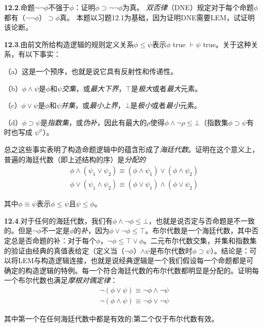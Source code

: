 \textbf{12.2}.命题${\lnot\lnot\phi}$不强于${\phi}$：证明${\phi\supset\lnot\lnot\phi}$为真。 \textit{双否律}（DNE）规定对于每个命题${\phi}$都有（${\lnot\lnot\phi}$）${\supset\phi}$真。 本题以习题12.1为基础，因为证明DNE需要LEM，试证明该论断。


\textbf{12.3}.由前文所给构造逻辑的规则定义关系${\phi\leq\psi}$表示${\phi }$ true ${\vdash}$${ \psi }$ true。关于这种关系，有以下事实：

（a）这是一个预序，也就是说它具有反射性和传递性。


（b）${\phi\land\psi}$是${\phi}$和${\psi}$\textit{交集}，或\textit{最大下界}，${\top}$是\textit{极大}或者\textit{最大}元素。%


（c）${\phi\lor\psi}$是${\phi}$和${\psi}$\textit{并集}，或\textit{最小上界}，${\bot}$是\textit{极小}或者\textit{最小}元素。


（d）${\phi\supset\psi}$是\textit{指数集}，或\textit{伪补}，因此有最大的${\rho}$使得${\phi \land \lnot\rho\leq\bot}$（指数集${\phi\supset\psi}$有时也写成 ${\psi^\phi}$）。


总之这些事实表明了构造命题逻辑中的蕴含形成了\textit{海廷代数}。证明在这个意义上，普遍的海廷代数（即上述结构的序）是\textit{分配的}
\begin{equation*}
\begin{split}
        &\phi\land(\psi_1\lor\psi_2)   \equiv (\phi\land\psi_1)\lor(\phi\land\psi_2)  \\
        &\phi\lor(\psi_1\land\psi_2)   \equiv (\phi\lor\psi_1)\land(\phi\lor\psi_2)  
\end{split}
\end{equation*}

其中${\phi\equiv\psi}$表示${\phi\leq\psi}$且${\psi\leq\phi}$。


\textbf{12.4}.对于任何的海廷代数，我们有${\phi \land \lnot\phi\leq\bot}$，也就是说否定与否命题是不一致的。但是${\lnot\phi}$不一定是${\phi}$的\textit{补}，因为${\phi \lor \lnot\phi\leq\top}$。布尔代数是一个海廷代数，其中否定总是否命题的补：对于每个${\phi}$，${\lnot\phi\leq\top \lor \phi}$。二元布尔代数交集，并集和指数集的验证由经典的真值表给定（定义当（${\lnot\phi}$）${\land\psi}$是布尔代数时${\phi\supset\psi}$）。结论是：可以将LEM与构造逻辑连接，也就是说经典逻辑是一个我们假设每一个命题都是可确定的构造逻辑的特例。每一个符合海廷代数的布尔代数都明显是分配的。证明每一个布尔代数也满足\textit{摩根对偶定律}：
\begin{equation*}
\begin{split}
        &\lnot(\phi\lor\psi)   \equiv \lnot\phi\land\lnot\psi   \\
        &\lnot(\phi\land\psi)   \equiv \lnot\phi\lor\lnot\psi  
\end{split}
\end{equation*}

其中第一个在任何海廷代数中都是有效的;第二个仅于布尔代数有效。


